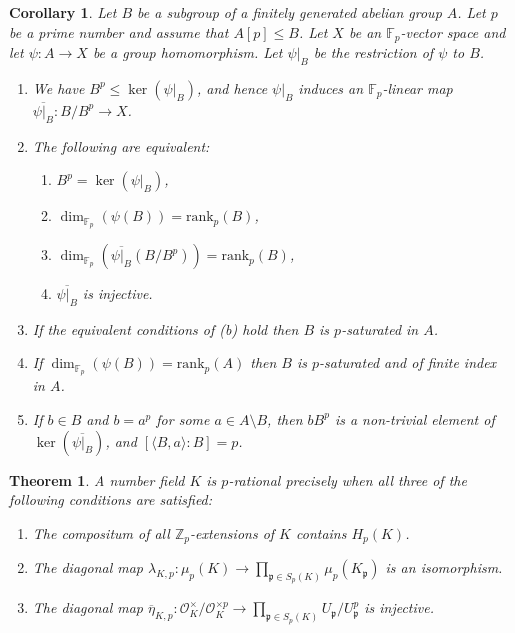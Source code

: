 \documentclass[10pt,a4paper]{amsart}
\newtheorem{corollary}{Corollary}
\newtheorem{theorem}{Theorem}
\newcommand{\F}{\mathbb{F}}
\newcommand{\Z}{\mathbb{Z}}
\newcommand{\rank}{\mathrm{rank}}
\begin{document}
\begin{corollary}\label{cor:p-sat}
Let $B$ be a subgroup of a finitely generated abelian group $A$.  
Let $p$ be a prime number and assume that $A[p] \leq B$.
Let $X$ be an $\F_p$-vector space and let $\psi \colon A \to X$ be a group homomorphism. 
Let $\psi \vert_{B}$ be the restriction of $\psi$ to $B$.
\renewcommand{\labelenumii}{(\roman{enumii})}
\begin{enumerate}
    \item 
    We have $B^{p} \leq \ker(\psi \vert_{B})$, and hence $\psi \vert_{B}$
    induces an $\F_{p}$-linear map $\overline{\psi \vert_{B}} \colon B/B^{p} \to X$.
    \item The following are equivalent:
    \begin{enumerate}
        \item $B^{p} = \ker(\psi \vert_{B})$,
        \item $\dim_{\F_p}(\psi(B)) = \rank_{p}(B)$,
        \item $\dim_{\F_p}(\overline{\psi \vert_{B}}(B/B^{p})) = \rank_{p}(B)$,
        \item $\overline{\psi \vert_{B}}$ is injective.
    \end{enumerate}
    \item If the equivalent conditions of \textup{(b)} 
    hold then $B$ is $p$-saturated in $A$.
    \item If $\dim_{\F_p}(\psi(B)) = \rank_{p}(A)$ then $B$ is $p$-saturated and of finite index in $A$.
    \item If $b \in B$ and $b = a^{p}$ for some $a \in A \setminus B$, 
    then $bB^{p}$ is a non-trivial element of $\ker(\overline{\psi \vert_{B}})$, and 
    $[\langle B, a \rangle : B]=p$.
\end{enumerate}    
\end{corollary}

\begin{theorem}\label{thm:nqd-char-p-rat}
A number field $K$ is $p$-rational precisely when all three of the following conditions are
satisfied:
\begin{enumerate}
    \item The compositum of all $\Z_{p}$-extensions of $K$ contains $H_{p}(K)$.
    \item The diagonal map $\lambda_{K,p} : \mu_{p}(K) \longrightarrow \prod_{\mathfrak{p} \in S_{p}(K)} 
    \mu_{p}(K_{\mathfrak{p}})$ is an isomorphism.
    \item The diagonal map 
    $\overline{\eta}_{K,p} : \mathcal{O}_{K}^{\times}/\mathcal{O}_{K}^{\times p} \longrightarrow 
    \prod_{\mathfrak{p} \in S_{p}(K)} U_{\mathfrak{p}}/ U_{\mathfrak{p}}^{p}$ is injective.
\end{enumerate}
\end{theorem}
\end{document}
